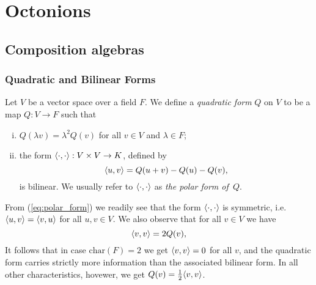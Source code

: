 
\chapter{Octonions}
\ifpdf
    \graphicspath{{Chapter1/Chapter1Figs/PNG/}{Chapter1/Chapter1Figs/PDF/}{Chapter1/Chapter1Figs/}}
\else
    \graphicspath{{Chapter1/Chapter1Figs/EPS/}{Chapter1/Chapter1Figs/}}
\fi

\label{chapter1}


\section{Composition algebras}

\subsection{Quadratic and Bilinear Forms}

Let $V$ be a vector space over a field $F$. We define a \textit{quadratic form}
$Q$ on $V$ to be a map $Q : V \rightarrow F$ such that
\begin{enumerate}[(i)]
\item $Q(\lambda v) = \lambda^2 Q(v)$ for all $v \in V$ and
  $\lambda \in F$;

\item the form $\langle \cdot, \cdot \rangle: V\times V \rightarrow K$,
  defined by
  \begin{equation}
  	\label{eq:polar_form}
    \langle u, v \rangle = Q(u+v) - Q(u) - Q(v),
  \end{equation}
  is bilinear. We usually refer to $\langle \cdot, \cdot \rangle$ as 
  \textit{the polar form of\ $Q$}. 
\end{enumerate}
From (\ref{eq:polar_form}) we readily see that the form $\langle \cdot, \cdot \rangle$ is symmetric,
i.e. $\langle u, v \rangle = \langle v, u \rangle$ for all $u,v \in V$. We also observe that for all 
$v \in V$ we have
\begin{equation}
	\langle v, v \rangle = 2Q(v),
\end{equation}
It follows that in case $\mathrm{char}(F) = 2$ we get $\langle v, v \rangle = 0$ for all $v$, and 
the quadratic form
carries strictly more information than the associated bilinear form. In all other characteristics,
hovewer, we get $Q(v) = \frac12 \langle v, v \rangle$. 

